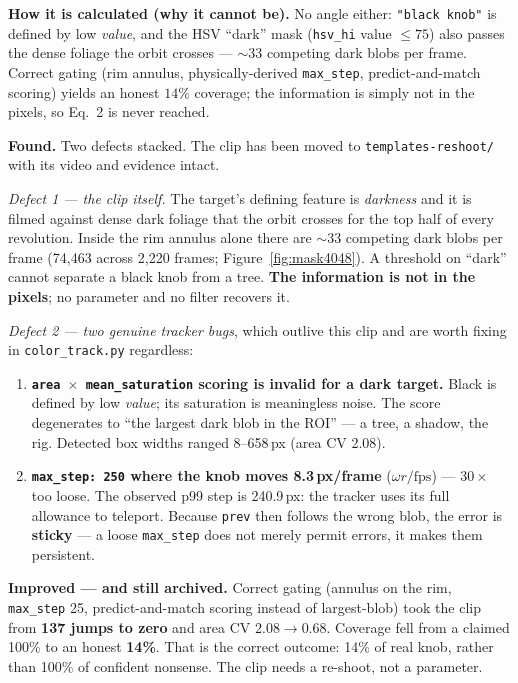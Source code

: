 \documentclass[11pt,a4paper]{article}
\begin{document}
\textbf{How it is calculated (why it cannot be).} No angle either: \texttt{"black knob"} is defined by
low \emph{value}, and the HSV ``dark'' mask (\texttt{hsv\_hi} value $\le 75$) also passes the dense
foliage the orbit crosses --- $\sim$33 competing dark blobs per frame. Correct gating (rim annulus,
physically-derived \texttt{max\_step}, predict-and-match scoring) yields an honest $14\%$ coverage;
the information is simply not in the pixels, so Eq.~2 is never reached.

\textbf{Found.} Two defects stacked. The clip has been moved to
\texttt{templates-reshoot/} with its video and evidence intact.

\emph{Defect 1 --- the clip itself.} The target's defining feature is \emph{darkness} and it is
filmed against dense dark foliage that the orbit crosses for the top half of every revolution.
Inside the rim annulus alone there are $\sim$33 competing dark blobs per frame (74{,}463 across
2{,}220 frames; Figure~\ref{fig:mask4048}). A threshold on ``dark'' cannot separate a black
knob from a tree. \textbf{The information is not in the pixels}; no parameter and no filter
recovers it.

\label{sec:4048bugs}\emph{Defect 2 --- two genuine tracker bugs}, which outlive this clip and are worth fixing in
\texttt{color\_track.py} regardless:

\begin{enumerate}
  \item \textbf{\texttt{area\,$\times$\,mean\_saturation} scoring is invalid for a dark target.}
  Black is defined by low \emph{value}; its saturation is meaningless noise. The score
  degenerates to ``the largest dark blob in the ROI'' --- a tree, a shadow, the rig. Detected
  box widths ranged 8--658\,px (area CV 2.08).
  \item \textbf{\texttt{max\_step: 250} where the knob moves 8.3\,px/frame} ($\omega r/\mathrm{fps}$)
  --- $30\times$ too loose. The observed p99 step is 240.9\,px: the tracker uses its full
  allowance to teleport. Because \texttt{prev} then follows the wrong blob, the error is
  \textbf{sticky} --- a loose \texttt{max\_step} does not merely permit errors, it makes them
  persistent.
\end{enumerate}

\textbf{Improved --- and still archived.} Correct gating (annulus on the rim, \texttt{max\_step}
25, predict-and-match scoring instead of largest-blob) took the clip from \textbf{137 jumps to
zero} and area CV $2.08 \rightarrow 0.68$. Coverage fell from a claimed 100\% to an honest
\textbf{14\%}. That is the correct outcome: 14\% of real knob, rather than 100\% of confident
nonsense. The clip needs a re-shoot, not a parameter.
\end{document}
